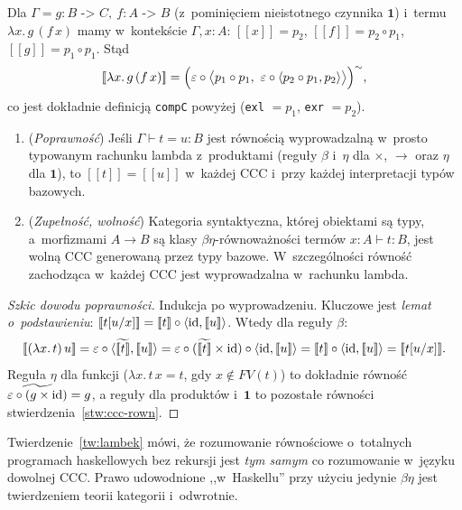 \begin{przyklad}
Dla $\Gamma = g{:}B\texttt{ -> }C,\ f{:}A\texttt{ -> }B$ (z~pominięciem nieistotnego czynnika $\mathbf{1}$) i~termu $\lambda x.\, g\,(f\,x)$ mamy w~kontekście $\Gamma, x{:}A$: $[\![x]\!] = p_2$, $[\![f]\!] = p_2\circ p_1$, $[\![g]\!] = p_1\circ p_1$. Stąd
\[
[\![\lambda x.\,g\,(f\,x)]\!] = \Bigl(\varepsilon\circ\bigl\langle p_1\circ p_1,\ \varepsilon\circ\langle p_2\circ p_1, p_2\rangle\bigr\rangle\Bigr)^{\sim},
\]
co jest dokładnie definicją \lstinline{compC} powyżej (\lstinline{exl} $= p_1$, \lstinline{exr} $= p_2$).
\end{przyklad}

\begin{twierdzenie}\label{tw:lambek}
\begin{enumerate}
\item (\emph{Poprawność}) Jeśli $\Gamma\vdash t = u : B$ jest równością wyprowadzalną w~prosto typowanym rachunku lambda z~produktami (reguły $\beta$ i~$\eta$ dla $\times$, $\to$ oraz $\eta$ dla $\mathbf{1}$), to $[\![t]\!] = [\![u]\!]$ w~każdej CCC i~przy każdej interpretacji typów bazowych.
\item (\emph{Zupełność, wolność}) Kategoria syntaktyczna, której obiektami są typy, a~morfizmami $A\to B$ są klasy $\beta\eta$-równoważności termów $x{:}A\vdash t : B$, jest wolną CCC generowaną przez typy bazowe. W~szczególności równość zachodząca w~każdej CCC jest wyprowadzalna w~rachunku lambda.
\end{enumerate}
\end{twierdzenie}

\begin{proof}[Szkic dowodu poprawności]
Indukcja po wyprowadzeniu. Kluczowe jest \emph{lemat o~podstawieniu}: $[\![t[u/x]]\!] = [\![t]\!]\circ\langle\mathrm{id},[\![u]\!]\rangle$. Wtedy dla reguły $\beta$:
\[
[\![(\lambda x.\,t)\,u]\!] = \varepsilon\circ\langle\widetilde{[\![t]\!]}, [\![u]\!]\rangle
= \varepsilon\circ(\widetilde{[\![t]\!]}\times\id)\circ\langle\id, [\![u]\!]\rangle
= [\![t]\!]\circ\langle\id, [\![u]\!]\rangle
= [\![t[u/x]]\!].
\]
Reguła $\eta$ dla funkcji ($\lambda x.\,t\,x = t$, gdy $x\notin FV(t)$) to dokładnie równość $\widetilde{\varepsilon\circ(g\times\mathrm{id})} = g$, a reguły dla produktów i~$\mathbf{1}$ to pozostałe równości stwierdzenia~\ref{stw:ccc-rown}.
\end{proof}

Twierdzenie~\ref{tw:lambek} mówi, że rozumowanie równościowe o~totalnych programach haskellowych bez rekursji jest \emph{tym samym} co rozumowanie w~języku dowolnej CCC. Prawo udowodnione ,,w~Haskellu'' przy użyciu jedynie $\beta\eta$ jest twierdzeniem teorii kategorii i~odwrotnie.

